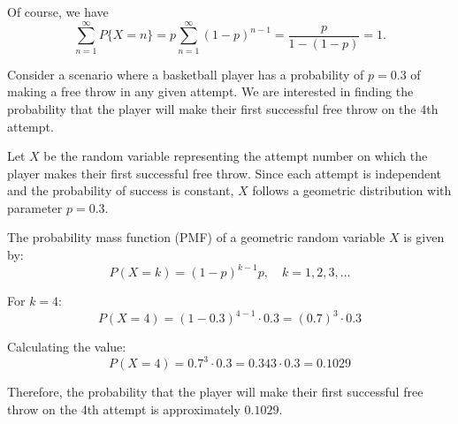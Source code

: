 Of course, we have
\[\sum_{n=1}^{\infty} P\{X=n\}=p \sum_{n=1}^{\infty}(1-p)^{n-1}=\frac{p}{1-(1-p)}=1.\]

\begin{example}
    Consider a scenario where a basketball player has a probability of \( p = 0.3 \) of making a free throw in any given attempt. We are interested in finding the probability that the player will make their first successful free throw on the 4th attempt.
    \begin{solution}
        Let \( X \) be the random variable representing the attempt number on which the player makes their first successful free throw. Since each attempt is independent and the probability of success is constant, \( X \) follows a geometric distribution with parameter \( p = 0.3 \).

The probability mass function (PMF) of a geometric random variable \( X \) is given by:
\[
P(X = k) = (1 - p)^{k-1} p, \quad k = 1, 2, 3, \ldots
\]

For \( k = 4 \):
\[
P(X = 4) = (1 - 0.3)^{4-1} \cdot 0.3 = (0.7)^3 \cdot 0.3
\]

Calculating the value:
\[
P(X = 4) = 0.7^3 \cdot 0.3 = 0.343 \cdot 0.3 = 0.1029
\]

Therefore, the probability that the player will make their first successful free throw on the 4th attempt is approximately \( 0.1029 \).
    \end{solution}
\end{example}

